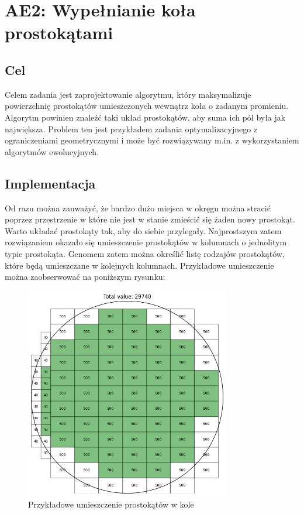\documentclass{article}
\begin{document}
\section*{AE2: Wypełnianie koła prostokątami}
\subsection*{Cel}
Celem zadania jest zaprojektowanie algorytmu, który maksymalizuje powierzchnię prostokątów umieszczonych wewnątrz koła o zadanym promieniu.  Algorytm powinien znaleźć taki układ prostokątów, aby suma ich pól była jak największa. Problem ten jest przykładem zadania optymalizacyjnego z ograniczeniami geometrycznymi i może być rozwiązywany m.in. z wykorzystaniem algorytmów ewolucyjnych.
\subsection*{Implementacja}
Od razu można zauważyć, że bardzo dużo miejsca w okręgu można stracić poprzez przestrzenie w które nie jest w stanie zmieścić się żaden nowy prostokąt. Warto układać prostokąty tak, aby do siebie przylegały. Najprostszym zatem rozwiązaniem okazało się umieszczenie prostokątów w kolumnach o jednolitym typie prostokąta. Genomem zatem można określić listę rodzajów prostokątów, które będą umieszczane w kolejnych kolumnach.
Przykładowe umieszczenie można zaobserwować na poniższym rysunku:
\begin{figure}[H]
    \centering
    \includegraphics[width=0.8\textwidth]{img/ae2/rectangles_example.png}
    \caption{Przykładowe umieszczenie prostokątów w kole}
\end{figure}
\end{document}
